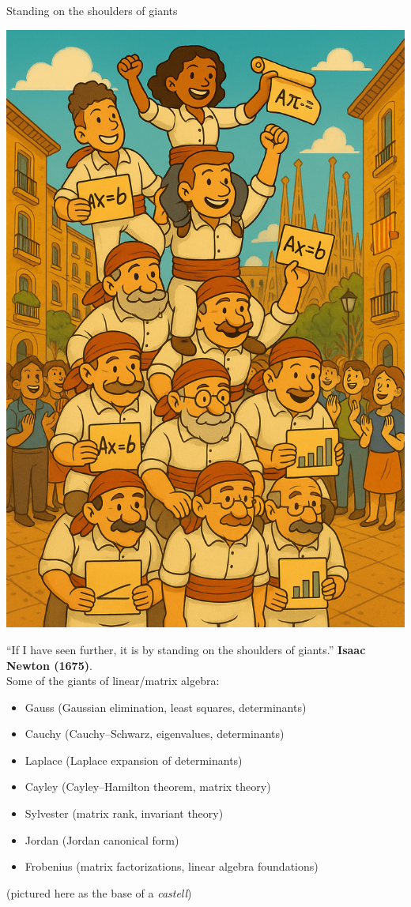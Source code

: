 \documentclass[11pt,aspectratio=169]{beamer}
\begin{document}
\begin{frame}{Standing on the shoulders of giants}
\begin{minipage}{5.5cm}
	\includegraphics[scale=.148]{vbreaks/tower}
\end{minipage}\begin{minipage}{10cm}
	``If I have seen further, it is by standing on the shoulders of giants.''  \textbf{Isaac Newton (1675)}.\\[4mm]
	Some of the giants of linear/matrix algebra:
	\begin{itemize}
		\item Gauss (Gaussian elimination, least squares, determinants)
		\item Cauchy (Cauchy–Schwarz, eigenvalues, determinants)
		\item Laplace (Laplace expansion of determinants)
		\item Cayley (Cayley–Hamilton theorem, matrix theory)
		\item Sylvester (matrix rank, invariant theory)
		\item Jordan (Jordan canonical form)
		\item Frobenius (matrix factorizations, linear algebra foundations)
	\end{itemize}
	(pictured here as the base of a \textit{castell})
\end{minipage}
\end{frame}
\end{document}
